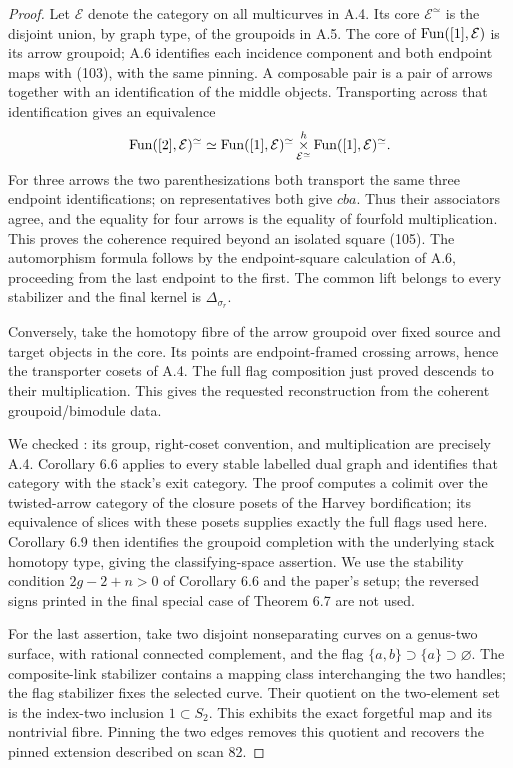 \begin{proof}
Let $\mathcal E$ denote the category on all multicurves in A.4. Its core $\mathcal E^{\simeq}$ is the disjoint union, by graph type, of the groupoids in A.5. The core of $\operatorname{Fun}([1],\mathcal E)$ is its arrow groupoid; A.6 identifies each incidence component and both endpoint maps with (103), with the same pinning. A composable pair is a pair of arrows together with an identification of the middle objects. Transporting across that identification gives an equivalence
\[
 \operatorname{Fun}([2],\mathcal E)^{\simeq}\simeq
 \operatorname{Fun}([1],\mathcal E)^{\simeq}
 \mathop{\times}^{h}_{\mathcal E^{\simeq}}
 \operatorname{Fun}([1],\mathcal E)^{\simeq}.
\]
For three arrows the two parenthesizations both transport the same three endpoint identifications; on representatives both give $cba$. Thus their associators agree, and the equality for four arrows is the equality of fourfold multiplication. This proves the coherence required beyond an isolated square (105). The automorphism formula follows by the endpoint-square calculation of A.6, proceeding from the last endpoint to the first. The common lift belongs to every stabilizer and the final kernel is $\Delta_{\sigma_r}$.

Conversely, take the homotopy fibre of the arrow groupoid over fixed source and target objects in the core. Its points are endpoint-framed crossing arrows, hence the transporter cosets of A.4. The full flag composition just proved descends to their multiplication. This gives the requested reconstruction from the coherent groupoid/bimodule data.

We checked \citet[Construction 3.18 and Lemma 3.19]{Jansen2023}: its group, right-coset convention, and multiplication are precisely A.4. Corollary 6.6 applies to every stable labelled dual graph and identifies that category with the stack's exit category. The proof computes a colimit over the twisted-arrow category of the closure posets of the Harvey bordification; its equivalence of slices with these posets supplies exactly the full flags used here. Corollary 6.9 then identifies the groupoid completion with the underlying stack homotopy type, giving the classifying-space assertion. We use the stability condition $2g-2+n>0$ of Corollary 6.6 and the paper's setup; the reversed signs printed in the final special case of Theorem 6.7 are not used.

For the last assertion, take two disjoint nonseparating curves on a genus-two surface, with rational connected complement, and the flag $\{a,b\}\supset\{a\}\supset\varnothing$. The composite-link stabilizer contains a mapping class interchanging the two handles; the flag stabilizer fixes the selected curve. Their quotient on the two-element set is the index-two inclusion $1\subset S_2$. This exhibits the exact forgetful map and its nontrivial fibre. Pinning the two edges removes this quotient and recovers the pinned extension described on scan 82.
\end{proof}

